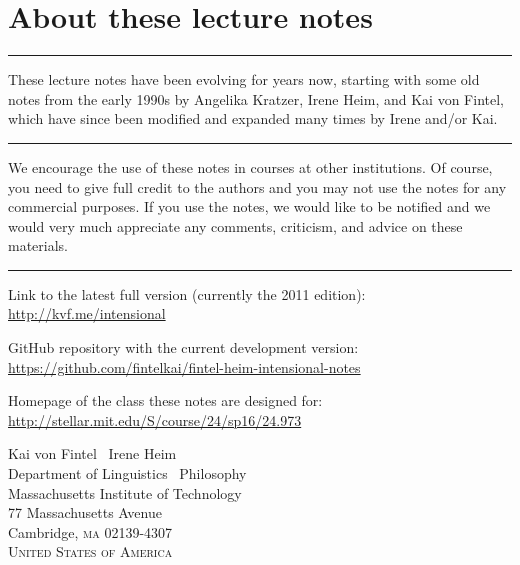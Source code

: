 \frontmatter

\title{}
\author{\and{}} 
\date{}

\pagestyle{empty}

\maketitle

\clearpage

\section*{About these lecture notes}

\plainbreak{1} 

These lecture notes have been evolving for years now, starting with some old notes from the early 1990s by Angelika Kratzer, Irene Heim, and Kai von Fintel, which have since been modified and expanded many times by Irene and/or Kai.

\plainbreak{1} 

We encourage the use of these notes in courses at other institutions. Of course, you need to give full credit to the authors and you may not use the notes for any commercial purposes. If you use the notes, we would like to be notified and we would very much appreciate any comments, criticism, and advice on these materials.

\plainbreak{1}

Link to the latest full version (currently the 2011 edition):\\[6pt]
                                             \null\hfill\url{http://kvf.me/intensional}
\medskip
                                            
\noindent GitHub repository with the current development version:\\[6pt]
            \null\hfill\url{https://github.com/fintelkai/fintel-heim-intensional-notes}

\medskip

\noindent Homepage of the class these notes are designed for:\\[6pt]
                        \null\hfill\url{http://stellar.mit.edu/S/course/24/sp16/24.973}

\vfill

\noindent Kai von Fintel \amp\ Irene Heim\\
Department of Linguistics \amp\ Philosophy\\
Massachusetts Institute of Technology\\
77 Massachusetts Avenue\\
Cambridge, \textsc{ma} 02139-4307\\
\textsc{United States of America} 

